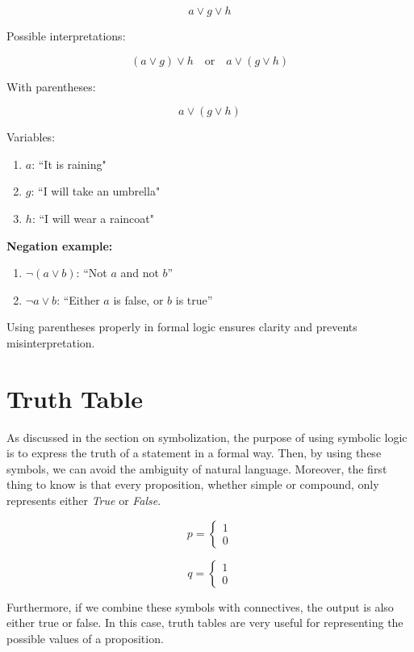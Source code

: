 \documentclass[12pt,a4paper,openany]{article}
\begin{document}
\[
a \lor g \lor h
\]

Possible interpretations:

\[
(a \lor g) \lor h \quad \text{or} \quad a \lor (g \lor h)
\]

With parentheses:

\[
a \lor (g \lor h)
\]

Variables:

\begin{enumerate}
\item \(a\): ``It is raining"
\item \(g\): ``I will take an umbrella"
\item \(h\): ``I will wear a raincoat"
\end{enumerate}

\textbf{Negation example:}

\begin{enumerate}
\item \(\lnot (a \lor b)\): ``Not \(a\) and not \(b\)'' 
\item \(\lnot a \lor b\): ``Either \(a\) is false, or \(b\) is true''
\end{enumerate}

Using parentheses properly in formal logic ensures clarity and prevents
misinterpretation.

\section{Truth Table}

As discussed in the section on symbolization, the purpose of using
symbolic logic is to express the truth of a statement in a formal way.
Then, by using these symbols, we can avoid the ambiguity of natural
language. Moreover, the first thing to know is that every proposition,
whether simple or compound, only represents either \emph{True} or
\emph{False}.

\[
p = \begin{cases}
\text{1} \\
\text{0}
\end{cases}
\]

\[
q = \begin{cases}
\text{1} \\
\text{0}
\end{cases}
\]

Furthermore, if we combine these symbols with connectives, the output is
also either true or false. In this case, truth tables are very useful
for representing the possible values of a proposition.
\end{document}

